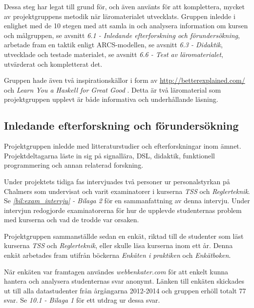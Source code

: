 \documentclass[]{article}
\begin{document}
Dessa steg har legat till grund för, och även använts för att
komplettera, mycket av projektgruppens metodik när läromaterialet
utvecklats. Gruppen inledde i enlighet med de 10 stegen med att samla
in och analysera information om kursen och målgruppen, se avsnitt
\textit{6.1 - Inledande efterforskning och förundersökning},
arbetade fram en taktik enligt ARCS-modellen, se avsnitt \textit{6.3 
- Didaktik}, utvecklade och testade materialet, se avsnitt \textit{6.6
- Test av läromaterialet}, utvärderat och kompletterat det.

Gruppen hade även två inspirationskällor i form av
\url{http://betterexplained.com/} och \textit{Learn You a Haskell for Great Good} \cite{learnyouahaskell}.
Detta är två läromaterial som projektgruppen upplevt är både
informativa och underhållande läsning.

\subsection{Inledande efterforskning och förundersökning}

Projektgruppen inledde med litteraturstudier och efterforskningar inom
ämnet. Projektdeltagarna läste in sig på signallära, DSL, didaktik,
funktionell programmering och annan relaterad forskning.

Under projektets tidiga fas intervjuades två personer ur
personalstyrkan på Chalmers som undervisat och varit examinatorer i
kurserna \textit{TSS} och \textit{Reglerteknik}.
Se \textit{\ref{bil:exam_intervju} - Bilaga 2} för en sammanfattning av denna
intervju. Under intervjun redogjorde examinatorerna för hur de
upplevde studenternas problem med kurserna och vad de trodde var
orsaken.

Projektgruppen sammanställde sedan en enkät, riktad till de studenter
som läst kurserna \textit{TSS} och \textit{Reglerteknik}, eller skulle
läsa kurserna inom ett år. Denna enkät arbetades fram utifrån böckerna
\textit{Enkäten i praktiken}\cite{enkaten_i_praktiken} och \textit{Enkätboken}\cite{enkatboken}.

När enkäten var framtagen användes \textit{webbenkater.com} för att
enkelt kunna hantera och analysera studenternas svar anonymt.
Länken till enkäten skickades ut till alla
datastudenter från årgångarna 2012-2014 och gruppen erhöll totalt 77
svar. Se \textit{10.1 - Bilaga 1} för ett utdrag ur dessa svar.
\end{document}
